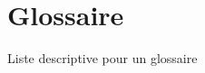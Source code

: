 \documentclass{framatexclass}
\begin{document}

                        
%


\chapter{Glossaire}


%

                    

 Liste descriptive pour un glossaire



\backmatter

            
                        

\end{document}
